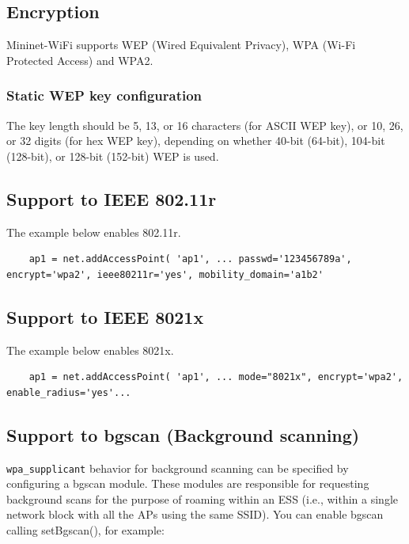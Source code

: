 \subsection{Encryption}
Mininet-WiFi supports WEP (Wired Equivalent Privacy), WPA (Wi-Fi Protected Access) and WPA2.

\subsubsection{Static WEP key configuration}
The key length should be 5, 13, or 16 characters (for ASCII WEP key), or 10, 26, or 32 digits (for hex WEP key), depending on whether 40-bit (64-bit), 104-bit (128-bit), or 128-bit (152-bit) WEP is used.

\subsection{Support to IEEE 802.11r}

The example below enables 802.11r.

\begin{verbatim}
    ap1 = net.addAccessPoint( 'ap1', ... passwd='123456789a', encrypt='wpa2', ieee80211r='yes', mobility_domain='a1b2'
\end{verbatim}

\subsection{Support to IEEE 8021x}

The example below enables 8021x.

\begin{verbatim}
    ap1 = net.addAccessPoint( 'ap1', ... mode="8021x", encrypt='wpa2', enable_radius='yes'...
\end{verbatim}

\subsection{Support to bgscan (Background scanning)}

\texttt{wpa\_supplicant} behavior for background scanning can be specified by configuring a bgscan module. These modules are responsible for requesting background scans for the purpose of roaming within an ESS (i.e., within a single network block with all the APs using the same SSID). You can enable bgscan calling setBgscan(), for example:

